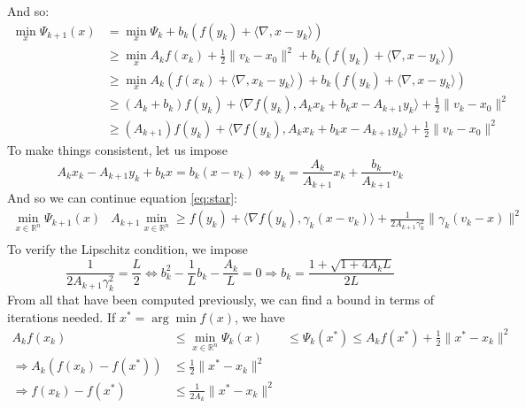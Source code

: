 \documentclass[12pt, openany]{report}
\newcommand{\R}{\mathbb{R}}
\theoremstyle{definition}
\begin{document}
And so:
\begin{equation}\label{eq:star}
	\begin{aligned}
		\min_x \Psi_{k+1}(x) &= \min_x \Psi_k + b_k \left( f(y_k)+ \langle \nabla , x-y_k \rangle \right)\\
		&\geq \min_x A_kf(x_k) + \frac{1}{2} \|v_k-x_0\|^2 + b_k \left( f(y_k)+ \langle \nabla , x-y_k \rangle \right)\\
		&\geq \min_x A_k \left( f(x_k) + \langle \nabla , x_k-y_k \rangle \right) + b_k \left( f(y_k)+ \langle \nabla , x-y_k \rangle \right)\\
		&\geq (A_k+b_k) f(y_k) + \langle \nabla f(y_k), A_kx_k+b_kx-A_{k+1}y_k \rangle + \frac{1}{2} \|v_k -x_0\|^2\\
		&\geq (A_{k+1}) f(y_k) + \langle \nabla f(y_k), A_kx_k+b_kx-A_{k+1}y_k \rangle + \frac{1}{2} \|v_k -x_0\|^2
	\end{aligned}
\end{equation}
To make things consistent, let us impose 
\begin{equation}
	A_k x_k - A_{k+1}y_k + b_kx = b_k(x-v_k) \Longleftrightarrow y_k = \frac{A_k}{A_{k+1}}x_k + \frac{b_k}{A_{k+1}}v_k
\end{equation}
And so we can continue equation \eqref{eq:star}:
\begin{equation}
	\begin{aligned}
		\min_{x\in \R^n} \Psi_{k+1}(x) &A_{k+1}\min_{x\in \R^n}\geq f(y_k) + \langle \nabla f(y_k), \gamma_k(x-v_k) \rangle + \frac{1}{2A_{k+1}\gamma_k^2} \|\gamma_k(v_k -x)\|^2\\
	\end{aligned}
\end{equation}
To verify the Lipschitz condition, we impose 
\begin{equation}
	\frac{1}{2A_{k+1}\gamma_k^2} =\frac{L}{2}  \Longleftrightarrow b_k^2 - \frac{1}{L} b_k - \frac{A_k}{L} = 0 \Longrightarrow b_k = \frac{1+\sqrt{1+4A_kL}}{2L}
\end{equation}
From all that have been computed previously, we can find a bound in terms of iterations needed. If $x^* = \arg\min f(x)$, we have 
\begin{equation}
	\begin{aligned}
		A_k f(x_k) &\le \min_{x \in \R^n} \Psi_k(x) &\leq \Psi_k(x^*)\le A_k f(x^*) + \frac{1}{2}\|x^*-x_k\|^2\\
		\Rightarrow A_k(f(x_k)-f(x^*)) &\leq \frac{1}{2}\|x^*-x_k\|^2\\
		\Rightarrow f(x_k)-f(x^*) &\leq \frac{1}{2A_k}\|x^*-x_k\|^2\\	
	\end{aligned}
\end{equation}
\end{document}
